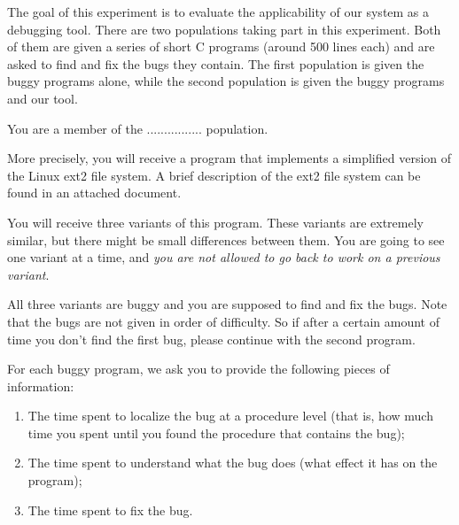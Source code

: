 \documentclass{article}
\title{}
\author{Instructions}
\date{July 30, 2003}
\begin{document}
\maketitle
\begin{flushleft}

\thispagestyle{empty}



\vspace{0.1in}
The goal of this experiment is to evaluate the applicability of our system 
as a debugging tool.  There are two populations taking part in this
experiment.  Both of them are given a series of short C programs (around 500 
lines each) and are asked to find and fix the bugs they contain. The first 
population is given the buggy programs alone, while the second population is 
given the buggy programs and our tool. 

\vspace{0.2in}
You are a member of the ................ population. 

\vspace{0.2in}

More precisely, you will receive a program that implements a simplified version
of the Linux ext2 file system.  A brief description of the ext2 file system can
be found in an attached document. 

\vspace{0.1in}
You will receive three variants of this program.  These variants are extremely
similar, but there might be small differences between them.  You are going
to see one variant at a time, and {\em you are not allowed to go back to work 
on a previous variant}.

\vspace{0.1in}
All three variants are buggy and you are supposed to find and fix the bugs.
Note that the bugs are not given in order of difficulty.  So if after a 
certain amount of time you don't find the first bug, please continue with
the second program.

\vspace{0.1in}
For each buggy program, we ask you to provide the following pieces of 
information:

\begin{enumerate}
\item{The time spent to localize the bug at a procedure level (that is, how 
      much time you spent until you found the procedure that contains the 
      bug);}

\item{The time spent to understand what the bug does (what effect it has on the
      program);}

\item{The time spent to fix the bug.}
\end{enumerate}


\end{flushleft}
\end{document}
